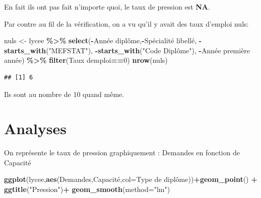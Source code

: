 \documentclass[
]{book}
\newenvironment{Shaded}{\begin{snugshade}}{\end{snugshade}}
\newcommand{\AttributeTok}[1]{\textcolor[rgb]{0.13,0.29,0.53}{#1}}
\newcommand{\DecValTok}[1]{\textcolor[rgb]{0.00,0.00,0.81}{#1}}
\newcommand{\FunctionTok}[1]{\textcolor[rgb]{0.13,0.29,0.53}{\textbf{#1}}}
\newcommand{\NormalTok}[1]{#1}
\newcommand{\OtherTok}[1]{\textcolor[rgb]{0.56,0.35,0.01}{#1}}
\newcommand{\SpecialCharTok}[1]{\textcolor[rgb]{0.81,0.36,0.00}{\textbf{#1}}}
\newcommand{\StringTok}[1]{\textcolor[rgb]{0.31,0.60,0.02}{#1}}
\begin{document}
En fait ils ont pas fait n'importe quoi, le taux de pression est \textbf{NA}.

Par contre au fil de la vérification, on a vu qu'il y avait des taux d'emploi nuls:

\begin{Shaded}
\begin{Highlighting}[]
\NormalTok{nuls }\OtherTok{\textless{}{-}}\NormalTok{ lycee }\SpecialCharTok{\%\textgreater{}\%} \FunctionTok{select}\NormalTok{(}\SpecialCharTok{{-}}\StringTok{\textasciigrave{}}\AttributeTok{Année diplôme}\StringTok{\textasciigrave{}}\NormalTok{,}\SpecialCharTok{{-}}\StringTok{\textasciigrave{}}\AttributeTok{Spécialité libellé}\StringTok{\textasciigrave{}}\NormalTok{,}
                 \SpecialCharTok{{-}}\FunctionTok{starts\_with}\NormalTok{(}\StringTok{"MEFSTAT"}\NormalTok{),}
                 \SpecialCharTok{{-}}\FunctionTok{starts\_with}\NormalTok{(}\StringTok{"Code Diplôme"}\NormalTok{),}
                 \SpecialCharTok{{-}}\StringTok{\textasciigrave{}}\AttributeTok{Année première année}\StringTok{\textasciigrave{}}\NormalTok{) }\SpecialCharTok{\%\textgreater{}\%} 
  \FunctionTok{filter}\NormalTok{(}\StringTok{\textasciigrave{}}\AttributeTok{Taux d\textquotesingle{}emploi}\StringTok{\textasciigrave{}}\SpecialCharTok{==}\DecValTok{0}\NormalTok{)}
\FunctionTok{nrow}\NormalTok{(nuls)}
\end{Highlighting}
\end{Shaded}

\begin{verbatim}
## [1] 6
\end{verbatim}

Ils sont au nombre de 10 quand même.

\hypertarget{analyses}{%
\section{Analyses}\label{analyses}}

On représente le taux de pression graphiquement : Demandes en fonction de Capacité

\begin{Shaded}
\begin{Highlighting}[]
\FunctionTok{ggplot}\NormalTok{(lycee,}\FunctionTok{aes}\NormalTok{(Demandes,Capacité,}\AttributeTok{col=}\StringTok{\textasciigrave{}}\AttributeTok{Type de diplôme}\StringTok{\textasciigrave{}}\NormalTok{))}\SpecialCharTok{+}\FunctionTok{geom\_point}\NormalTok{() }\SpecialCharTok{+}
  \FunctionTok{ggtitle}\NormalTok{(}\StringTok{"Pression"}\NormalTok{)}\SpecialCharTok{+}
  \FunctionTok{geom\_smooth}\NormalTok{(}\AttributeTok{method=}\StringTok{"lm"}\NormalTok{)}
\end{Highlighting}
\end{Shaded}
\end{document}
